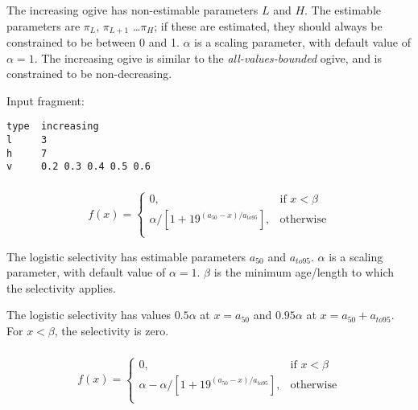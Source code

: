 The increasing ogive has non-estimable parameters $L$ and $H$. The estimable parameters are $\pi_L$, $\pi_{L+1}$ \ldots $\pi_H$; if these are estimated, they should always be constrained to be between 0 and 1. $\alpha$ is a scaling parameter, with default value of $\alpha = 1$. The increasing ogive is similar to the \textit{all-values-bounded} ogive, and is constrained to be non-decreasing.

Input fragment: {\small{\begin{verbatim}
type  increasing
l     3
h     7
v     0.2 0.3 0.4 0.5 0.6

\end{verbatim}}}
\subsubsection[Logistic]{}\label{sec:Selectivity-Logistic}

\begin{equation}
  f(x) = \begin{cases}
  	0, & \text{if $x < \beta$} \\
   \alpha / [1+19^{(a_{50}-x)/a_{to95}}], & \text{otherwise} \\
   \end{cases}
\end{equation}

The logistic selectivity has estimable parameters $a_{50}$ and $a_{to95}$. $\alpha$ is a scaling parameter, with default value of $\alpha = 1$. $\beta$ is the minimum age/length to which the selectivity applies. 

The logistic selectivity has values $0.5 \alpha$ at $x=a_{50}$ and $0.95 \alpha$ at $x=a_{50}+a_{to95}$. For $x < \beta$, the selectivity is zero.

\subsubsection[Inverse logistic]{}\label{sec:Selectivity-InverseLogistic} 

\begin{equation}
  f(x) = \begin{cases}
	0, & \text{if $x < \beta$} \\
    \alpha - \alpha / [1+19^{(a_{50}-x)/a_{to95}}], & \text{otherwise} \\
   \end{cases}
\end{equation}

